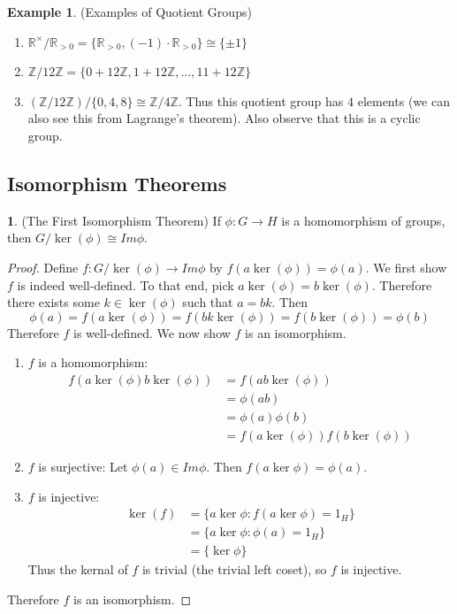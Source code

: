 \documentclass[12pt]{article}
\theoremstyle{definition}
\newtheorem{theorem}{\color{ForestGreen}{\textbf{Theorem}}}
\newtheorem{example}{\color{WildStrawberry}Example}
\theoremstyle{definition}
\begin{document}
\begin{example}(Examples of Quotient Groups)
\begin{enumerate}
	\item $\mathbb{R}^{\times} / \mathbb{R}_{> 0} = \{\mathbb{R}_{> 0}, (-1) \cdot \mathbb{R}_{> 0}\} \cong \{\pm 1\}$
	\item $\mathbb{Z} / 12 \mathbb{Z} = \{0 + 12 \mathbb{Z}, 1 + 12 \mathbb{Z}, \ldots, 11 + 12 \mathbb{Z} \} $
	\item $(\mathbb{Z} / 12 \mathbb{Z}) / \{0, 4, 8 \} \cong \mathbb{Z} / 4 \mathbb{Z}$. Thus this quotient group has $4$ elements (we can also see this from Lagrange's theorem). Also observe that this is a cyclic group.
\end{enumerate}
\end{example}

\subsection{Isomorphism Theorems}

\begin{theorem}(The First Isomorphism Theorem)
If $\phi:G\to H$ is a homomorphism of groups, then $G / \ker(\phi) \cong Im \phi$. 
\end{theorem}

\begin{proof}
Define $f: G / \ker(\phi) \to Im \phi$ by $f(a \ker(\phi)) = \phi(a)$. We first show $f$ is indeed well-defined. To that end, pick $a \ker(\phi) = b \ker(\phi)$. Therefore there exists some $k \in \ker(\phi)$ such that $a = bk$. Then
\begin{equation}
	\phi(a) = f(a \ker(\phi)) = f(bk \ker(\phi)) = f(b \ker(\phi)) = \phi(b)
\end{equation}
Therefore $f$ is well-defined. We now show $f$ is an isomorphism. 

\begin{enumerate}
	\item $f$ is a homomorphism: 
	\begin{align*}
		f(a \ker(\phi) b \ker(\phi)) &= f(ab \ker(\phi)) \\
		&=  \phi(ab) \\
		&= \phi(a)\phi(b) \tag{$\phi$ is a homomorphism} \\
		&= f(a \ker(\phi)) f(b \ker(\phi))
	\end{align*}

	\item $f$ is surjective: Let $\phi(a) \in Im \phi$. Then $f(a \ker \phi) = \phi(a)$. 
	\item $f$ is injective:  
	\begin{align*}
		\ker(f) &= \{a \ker \phi : f(a \ker \phi) = 1_H \} \\
		&= \{a \ker \phi : \phi(a) = 1_H \} \\
		&= \{\ker \phi \} 
	\end{align*}
	Thus the kernal of $f$ is trivial (the trivial left coset), so $f$ is injective. 
\end{enumerate}

Therefore $f$ is an isomorphism.
\end{proof}
\end{document}

